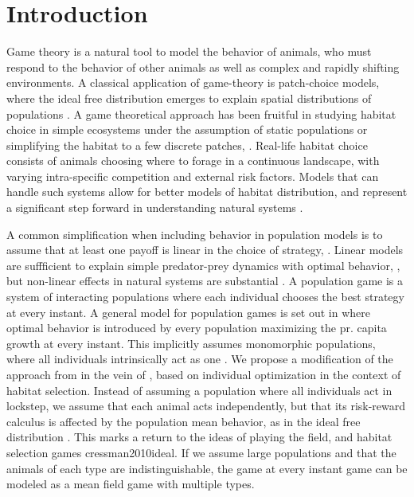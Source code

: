 \section{Introduction}

Game theory is a natural tool to model the behavior of animals, who must respond to the behavior of other animals as well as complex and rapidly shifting environments. A classical application of game-theory is patch-choice models, where the ideal free distribution emerges to explain spatial distributions of populations \citep{cressman2004ideal}. A game theoretical approach has been fruitful in studying habitat choice in simple ecosystems under the assumption of static populations or simplifying the habitat to a few discrete patches, \citep{cressman2010ideal, valdovinos2010consequences}. Real-life habitat choice consists of animals choosing where to forage in a continuous landscape, with varying intra-specific competition and external risk factors. Models that can handle such systems allow for better models of habitat distribution, and represent a significant step forward in understanding natural systems \citep{morris2003shadows}.

A common simplification when including behavior in population models is to assume that at least one payoff is linear in the choice of strategy, \citep{krivan1997dynamic}. Linear models are suffficient to explain simple predator-prey dynamics with optimal behavior, \citep{kvrivan2007lotka}, but non-linear effects in natural systems are substantial \citep{gross2009generalized}. A population game is a system of interacting populations where each individual chooses the best strategy at every instant. A general model for population games is set out in \citep{vincent2005evolutionary} where optimal behavior is introduced by every population maximizing the pr. capita growth at every instant. This implicitly assumes monomorphic populations, where all individuals intrinsically act as one \citep{malone2020ecology,stump2017optimally}. We propose a modification of the approach from \citep{vincent2005evolutionary} in the vein of \citep{cressman2010ideal}, based on individual optimization in the context of habitat selection. Instead of assuming a population where all individuals act in lockstep, we assume that each animal acts independently, but that its risk-reward calculus is affected by the population mean behavior, as in the ideal free distribution \citep{fretwell1969territorial}. This marks a return to the ideas of playing the field, \citep{smith1982evolution} and habitat selection games {cressman2010ideal}. If we assume large populations and that the animals of each type are indistinguishable, the game at every instant game can be modeled as a mean field game with multiple types.


